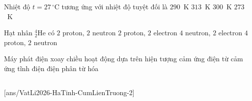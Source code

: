 	\begin{ex}%
		Nhiệt độ $t=27\,^\circ\text{C}$ tương ứng với nhiệt độ tuyệt đối là
		\choice
		{$290$~K}
		{$313$~K}
		{\True $300$~K}
		{$273$~K}
	\end{ex}

	\begin{ex}%
		Hạt nhân ${}^4_2\text{He}$ có
		\choice
		{\True $2$ proton, $2$ neutron}
		{$2$ proton, $2$ electron}
		{$4$ neutron, $2$ electron}
		{$4$ proton, $2$ neutron}
	\end{ex}

	\begin{ex}%
		Máy phát điện xoay chiều hoạt động dựa trên hiện tượng
		\choice
		{\True cảm ứng điện từ}
		{cảm ứng tĩnh điện}
		{điện phân}
		{từ hóa}
	\end{ex}

	\subsection*{}
	\setcounter{ex}{0}
	[ans/VatLi2026-HaTinh-CumLienTruong-2]

